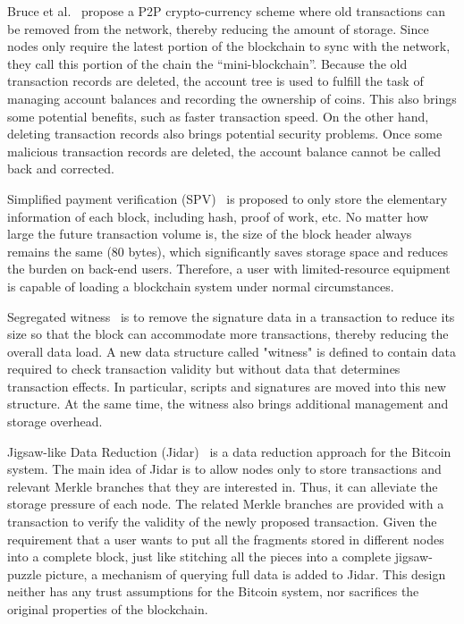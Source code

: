 \documentclass[acmsmall]{acmart}
\begin{document}
Bruce et al.~\cite{bruce2014mini} propose a P2P crypto-currency scheme where old transactions can be removed from the network, thereby reducing the amount of storage. Since nodes only require the latest portion of the blockchain to sync with the network, they call this portion of the chain the “mini-blockchain”. Because the old transaction records are deleted, the account tree is used to fulfill the task of managing account balances and recording the ownership of coins. This also brings some potential benefits, such as faster transaction speed.
On the other hand, deleting transaction records also brings potential security problems. Once some malicious transaction records are deleted, the account balance cannot be called back and corrected.
 
 

Simplified payment verification (SPV)~\cite{wiki2015scalability} is proposed to only store the elementary information of each block, including hash, proof of work, etc. No matter how large the future transaction volume is, the size of the block header always remains the same (80 bytes), which significantly saves storage space and reduces the burden on back-end users. Therefore, a user with limited-resource equipment is capable of loading a blockchain system under normal circumstances.
 

Segregated witness~\cite{lombrozo2015segregated} is to remove the signature data in a transaction to reduce its size so that the block can accommodate more transactions, thereby reducing the overall data load. A new data structure called "witness" is defined to contain data required to check transaction validity but without data that determines transaction effects. In particular, scripts and signatures are moved into this new structure. At the same time, the witness also brings additional management and storage overhead.


Jigsaw-like Data Reduction (Jidar)~\cite{dai2019jidar} is a data reduction approach for the Bitcoin system. The main idea of Jidar is to allow nodes only to store transactions and relevant Merkle branches that they are interested in. Thus, it can alleviate the storage pressure of each node. The related Merkle branches are provided with a transaction to verify the validity of the newly proposed transaction. Given the requirement that a user wants to put all the fragments stored in different nodes into a complete block, just like stitching all the pieces into a complete jigsaw-puzzle picture, a mechanism of querying full data is added to Jidar. This design neither has any trust assumptions for the Bitcoin system, nor sacrifices the original properties of the blockchain.
 
\end{document}
